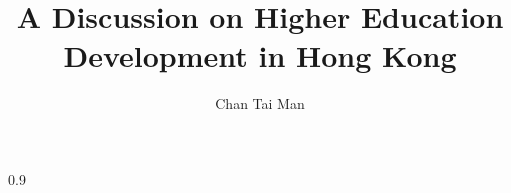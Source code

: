 \documentclass[a4paper,12pt,oneside,times,numbered,PageStyleIII]{PhDThesisPSnPDF}
\title{A Discussion on Higher Education Development in Hong Kong}
\author{Chan Tai Man}
\begin{document}
\frontmatter

\maketitle

%








\tableofcontents

\listoffigures

\listoftables



\mainmatter





\begin{spacing}{0.9}

\nocite{*}

\cleardoublepage




\end{spacing}
\end{document}
